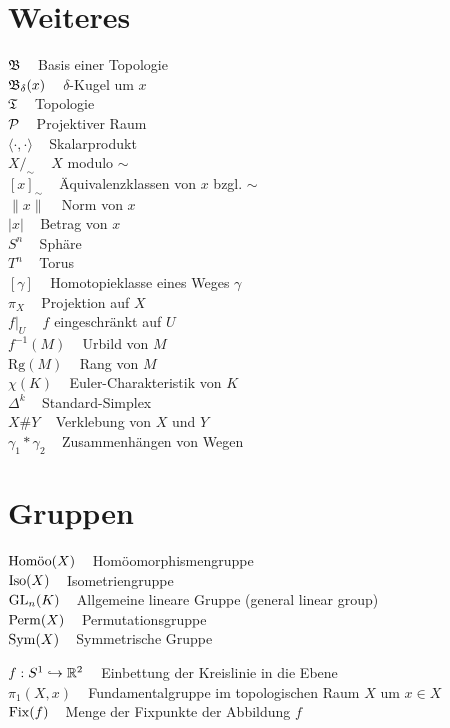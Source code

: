 \begin{minipage}[t]{0.45\textwidth}

\section*{Weiteres}
$\fB\;\;\;$ Basis einer Topologie\\
$\fB_\delta(x)\;\;\;$ $\delta$-Kugel um $x$\\
$\fT\;\;\;$ Topologie\\

$\praum\;\;\;$ Projektiver Raum\\
$\langle \cdot , \cdot \rangle\;\;\;$ Skalarprodukt\\
$X /_\sim\;\;\;$ $X$ modulo $\sim$\\
$[x]_\sim\;\;\;$ Äquivalenzklassen von $x$ bzgl. $\sim$\\
$\| x \|\;\;\;$ Norm von $x$\\
$| x |\;\;\;$ Betrag von $x$\\

$S^n\;\;\;$ Sphäre\\
$T^n\;\;\;$ Torus\\

$[\gamma]\;\;\;$ Homotopieklasse eines Weges $\gamma$\\
$\pi_X\;\;\;$ Projektion auf $X$\\
$f|_U\;\;\;$ $f$ eingeschränkt auf $U$\\
$f^{-1}(M)\;\;\;$ Urbild von $M$\\
$\text{Rg}(M)\;\;\;$ Rang von $M$\\
$\chi(K)\;\;\;$ Euler-Charakteristik von $K$\\
$\Delta^k\;\;\;$ Standard-Simplex\\
$X \# Y\;\;\;$ Verklebung von $X$ und $Y$\\
$\gamma_1 * \gamma_2\;\;\;$ Zusammenhängen von Wegen\\
\end{minipage}

\section*{Gruppen}
$\Homoo(X)\;\;\;$ Homöomorphismengruppe\\
$\Iso(X)\;\;\;$ Isometriengruppe\\
$\GL_n(K)\;\;\;$ Allgemeine lineare Gruppe (general linear group)\\
$\Perm(X)\;\;\;$ Permutationsgruppe\\
$\Sym(X)\;\;\;$ Symmetrische Gruppe

$f:S^1 \hookrightarrow \mdr^2\;\;\;$ Einbettung der Kreislinie in die Ebene\\
$\pi_1(X,x)\;\;\;$ Fundamentalgruppe im topologischen Raum $X$ um $x \in X$\\
$\Fix(f)\;\;\;$ Menge der Fixpunkte der Abbildung $f$

